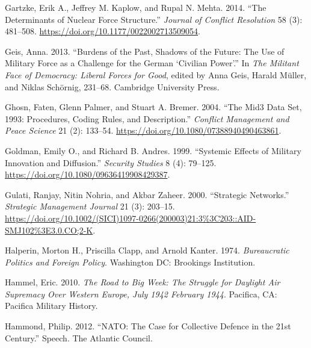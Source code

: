\documentclass[
  12,
  letterpaper,
  DIV=11,
  numbers=noendperiod]{scrartcl}
\newlength{\cslhangindent}
\newlength{\cslentryspacingunit} %
\newenvironment{CSLReferences}[2] %
 {%
  \setlength{\parindent}{0pt}
  \ifodd #1
  \let\oldpar\par
  \def\par{\hangindent=\cslhangindent\oldpar}
  \fi
  \setlength{\parskip}{#2\cslentryspacingunit}
 }%
 {}
\begin{document}
\begin{CSLReferences}{1}{0}
\leavevmode{}%
Gartzke, Erik A., Jeffrey M. Kaplow, and Rupal N. Mehta. 2014. {``The
{Determinants} of {Nuclear Force Structure}.''} \emph{Journal of
Conflict Resolution} 58 (3): 481--508.
\url{https://doi.org/10.1177/0022002713509054}.

\leavevmode{}%
Geis, Anna. 2013. {``Burdens of the Past, Shadows of the Future: The Use
of Military Force as a Challenge for the {German} {`Civilian Power'}.''}
In \emph{The {Militant Face} of {Democracy}: {Liberal Forces} for
{Good}}, edited by Anna Geis, Harald Müller, and Niklas Schörnig,
231--68. {Cambridge University Press}.

\leavevmode{}%
Ghosn, Faten, Glenn Palmer, and Stuart A. Bremer. 2004. {``The {Mid3
Data Set}, 1993: {Procedures}, {Coding Rules}, and
{Description}.''} \emph{Conflict Management and Peace Science} 21 (2):
133--54. \url{https://doi.org/10.1080/07388940490463861}.

\leavevmode{}%
Goldman, Emily O., and Richard B. Andres. 1999. {``Systemic Effects of
Military Innovation and Diffusion.''} \emph{Security Studies} 8 (4):
79--125. \url{https://doi.org/10.1080/09636419908429387}.

\leavevmode{}%
Gulati, Ranjay, Nitin Nohria, and Akbar Zaheer. 2000. {``Strategic
Networks.''} \emph{Strategic Management Journal} 21 (3): 203--15.
\url{https://doi.org/10.1002/(SICI)1097-0266(200003)21:3\%3C203::AID-SMJ102\%3E3.0.CO;2-K}.

\leavevmode{}%
Halperin, Morton H., Priscilla Clapp, and Arnold Kanter. 1974.
\emph{Bureaucratic {Politics} and {Foreign Policy}}. {Washington DC}:
{Brookings Institution}.

\leavevmode{}%
Hammel, Eric. 2010. \emph{The {Road} to {Big Week}: {The Struggle} for
{Daylight Air Supremacy Over Western Europe}, {July} 1942 \textendash{}
{February} 1944}. {Pacifica, CA}: {Pacifica Military History}.

\leavevmode{}%
Hammond, Philip. 2012. {``{NATO}: {The} Case for Collective Defence in
the 21st {Century}.''} Speech. {The Atlantic Council}.


\end{CSLReferences}
\end{document}
